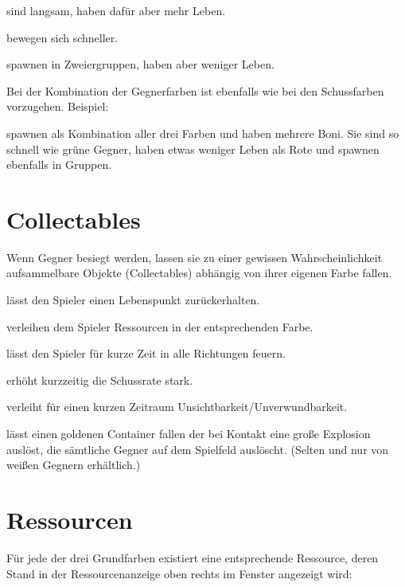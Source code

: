\renewcommand{\itmspace}{7.5em}
{sind langsam, haben dafür aber mehr Leben.}

{bewegen sich schneller.}

{spawnen in Zweiergruppen, haben aber weniger Leben.}

Bei der Kombination der Gegnerfarben ist ebenfalls wie bei den Schussfarben vorzugehen. Beispiel:

{spawnen als Kombination aller drei Farben und haben mehrere Boni. Sie sind so schnell wie grüne Gegner, haben etwas weniger Leben als Rote und spawnen ebenfalls in Gruppen.}




\section{Collectables}
\label{sect:Collectables}

Wenn Gegner besiegt werden, lassen sie zu einer gewissen Wahrscheinlichkeit aufsammelbare Objekte (Collectables) abhängig von ihrer eigenen Farbe fallen.

\renewcommand{\itmspace}{5.5em}
{lässt den Spieler einen Lebenspunkt zurückerhalten.}

{verleihen dem Spieler Ressourcen in der entsprechenden Farbe.}

{lässt den Spieler für kurze Zeit in alle Richtungen feuern.}

{erhöht kurzzeitig die Schussrate stark.}

{verleiht für einen kurzen Zeitraum Unsichtbarkeit/Unverwundbarkeit.}

{lässt einen goldenen Container fallen der bei Kontakt eine gro{\ss}e Explosion auslöst, die sämtliche Gegner auf dem Spielfeld auslöscht. (Selten und nur von wei{\ss}en Gegnern erhältlich.)}




\section{Ressourcen}
\label{sect:ressourcen}

Für jede der drei Grundfarben existiert eine entsprechende Ressource, deren Stand in der Ressourcenanzeige oben rechts im Fenster angezeigt wird:

